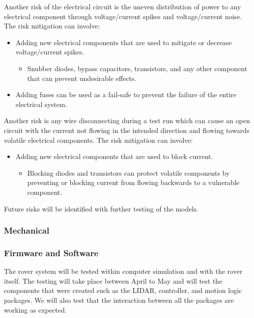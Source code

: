\documentclass[a4paper, 10pt]{article}
\begin{document}
Another risk of the electrical circuit is the uneven distribution of power to any electrical component through voltage/current spikes and voltage/current noise. The risk mitigation can involve:

\begin{itemize}
\item
Adding new electrical components that are used to mitigate or decrease voltage/current spikes.

	\begin{itemize}
		\item
		Snubber diodes, bypass capacitors, transistors, and any other component that can prevent undesirable effects. 
	\end{itemize}
	
\item
Adding fuses can be used as a fail-safe to prevent the failure of the entire electrical system.
\end{itemize}


Another risk is any wire disconnecting during a test run which can cause an open circuit with the current not flowing in the intended direction and flowing towards volatile electrical components. The risk mitigation can involve:

\begin{itemize}
\item
Adding new electrical components that are used to block current.

	\begin{itemize}
		\item
		Blocking diodes and transistors can protect volatile components by preventing or blocking current from flowing backwards to a vulnerable component. 
	\end{itemize}
\end{itemize}

Future risks will be identified with further testing of the models.

		\subsubsection{Mechanical}
		\subsubsection{Firmware and Software}
		The rover system will be tested within computer simulation and with the rover itself. The testing will take place between April to May and will test the components that were created such as the LIDAR, controller, and motion logic packages. We will also test that the interaction between all the packages are working as expected. 
		
\end{document}
